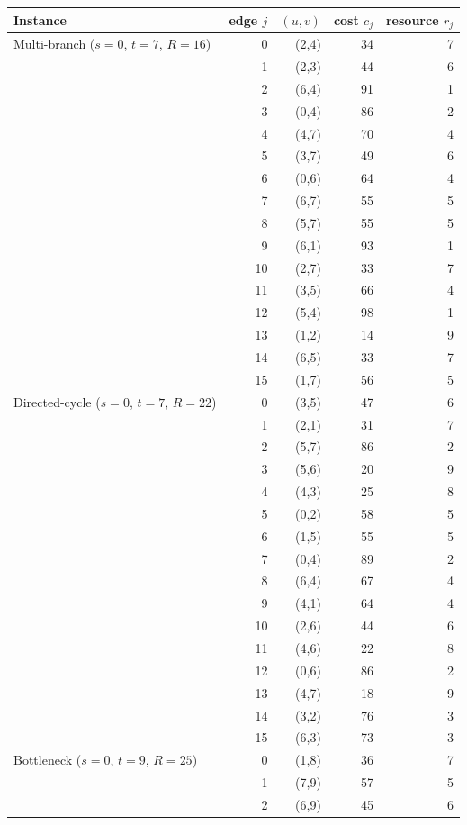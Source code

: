 \begin{longtable}{lrrrr}
\toprule
Instance & edge $j$ & $(u,v)$ & cost $c_j$ & resource $r_j$ \\
\midrule\endhead
Multi-branch ($s=0$, $t=7$, $R=16$) & 0 & (2,4) & 34 & 7 \\
 & 1 & (2,3) & 44 & 6 \\
 & 2 & (6,4) & 91 & 1 \\
 & 3 & (0,4) & 86 & 2 \\
 & 4 & (4,7) & 70 & 4 \\
 & 5 & (3,7) & 49 & 6 \\
 & 6 & (0,6) & 64 & 4 \\
 & 7 & (6,7) & 55 & 5 \\
 & 8 & (5,7) & 55 & 5 \\
 & 9 & (6,1) & 93 & 1 \\
 & 10 & (2,7) & 33 & 7 \\
 & 11 & (3,5) & 66 & 4 \\
 & 12 & (5,4) & 98 & 1 \\
 & 13 & (1,2) & 14 & 9 \\
 & 14 & (6,5) & 33 & 7 \\
 & 15 & (1,7) & 56 & 5 \\
\midrule
Directed-cycle ($s=0$, $t=7$, $R=22$) & 0 & (3,5) & 47 & 6 \\
 & 1 & (2,1) & 31 & 7 \\
 & 2 & (5,7) & 86 & 2 \\
 & 3 & (5,6) & 20 & 9 \\
 & 4 & (4,3) & 25 & 8 \\
 & 5 & (0,2) & 58 & 5 \\
 & 6 & (1,5) & 55 & 5 \\
 & 7 & (0,4) & 89 & 2 \\
 & 8 & (6,4) & 67 & 4 \\
 & 9 & (4,1) & 64 & 4 \\
 & 10 & (2,6) & 44 & 6 \\
 & 11 & (4,6) & 22 & 8 \\
 & 12 & (0,6) & 86 & 2 \\
 & 13 & (4,7) & 18 & 9 \\
 & 14 & (3,2) & 76 & 3 \\
 & 15 & (6,3) & 73 & 3 \\
\midrule
Bottleneck ($s=0$, $t=9$, $R=25$) & 0 & (1,8) & 36 & 7 \\
 & 1 & (7,9) & 57 & 5 \\
 & 2 & (6,9) & 45 & 6 \\

\end{longtable}
